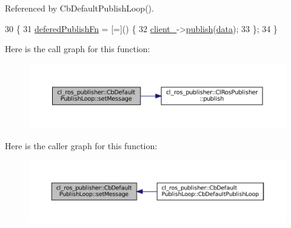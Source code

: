 Referenced by Cb\+Default\+Publish\+Loop().


\begin{DoxyCode}
30     \{
31         \hyperlink{classcl__ros__publisher_1_1CbDefaultPublishLoop_ac0044704637edbd8f79a69d5b06de9ba}{deferedPublishFn} = [=]() \{
32             \hyperlink{classcl__ros__publisher_1_1CbDefaultPublishLoop_a483b8c34b88dadc718fbf4bf1f95acb5}{client\_}->\hyperlink{classcl__ros__publisher_1_1ClRosPublisher_a3517d62fb0703a0a72efe6de7ad1a6d8}{publish}(\hyperlink{namespacekeyboard__server__node_abfec01745fb17e2aa813913bea03d707}{data});
33         \};
34     \}
\end{DoxyCode}
Here is the call graph for this function\+:
\nopagebreak
\begin{figure}[H]
\begin{center}
\leavevmode
\includegraphics[width=350pt]{classcl__ros__publisher_1_1CbDefaultPublishLoop_a0377d84fde4cd1193abe5daf172359a7_cgraph}
\end{center}
\end{figure}
Here is the caller graph for this function\+:
\nopagebreak
\begin{figure}[H]
\begin{center}
\leavevmode
\includegraphics[width=350pt]{classcl__ros__publisher_1_1CbDefaultPublishLoop_a0377d84fde4cd1193abe5daf172359a7_icgraph}
\end{center}
\end{figure}
\mbox{\label{classcl__ros__publisher_1_1CbDefaultPublishLoop_aef241d1976f0105643976545880d5e21}} 
